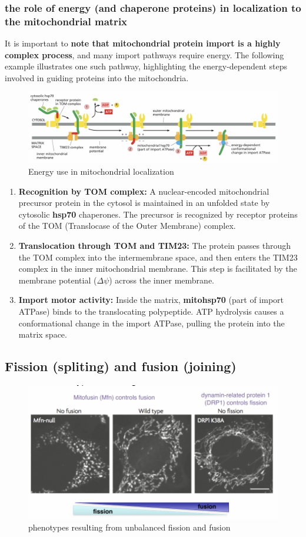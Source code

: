 \documentclass[../main.tex]{subfiles}
\begin{document}
\subsubsection{the role of energy (and chaperone proteins) in localization to the mitochondrial matrix}
It is important to\textbf{ note that mitochondrial protein import is a highly complex process}, and many import pathways require energy. The following example illustrates one such pathway, highlighting the energy-dependent steps involved in guiding proteins into the mitochondria.

\begin{figure}[H]
    \centering
    \includegraphics[width=\linewidth]{Energy.png}
    \caption{Energy use in mitochondrial localization}
    \label{fig:enter-label}
\end{figure}
\begin{enumerate}
    \item \textbf{Recognition by TOM complex:} A nuclear-encoded mitochondrial precursor protein in the cytosol is maintained in an unfolded state by cytosolic  \textbf{\gls{hsp70}} chaperones. The precursor is recognized by receptor proteins of the TOM (Translocase of the Outer Membrane) complex.
    
    \item \textbf{Translocation through TOM and TIM23:} The protein passes through the TOM complex into the intermembrane space, and then enters the TIM23 complex in the inner mitochondrial membrane. This step is facilitated by the membrane potential (\( \Delta \psi \)) across the inner membrane.
    
    \item \textbf{Import motor activity:} Inside the matrix, \textbf{\gls{mitohsp70}} (part of import ATPase) binds to the translocating polypeptide. ATP hydrolysis causes a conformational change in the import ATPase, pulling the protein into the matrix space.
\end{enumerate}
\subsection{Fission (spliting) and fusion (joining)}
\begin{figure}[H]
    \centering
    \includegraphics[width=0.5\linewidth]{phenotypes.png}
    \caption{phenotypes resulting from unbalanced fission and fusion}
    \label{fig:enter-label}
\end{figure}
\end{document}
